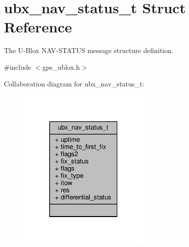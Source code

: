 \hypertarget{structubx__nav__status__t}{\section{ubx\+\_\+nav\+\_\+status\+\_\+t Struct Reference}
\label{structubx__nav__status__t}
}


The U-\/\+Blox N\+A\+V-\/\+S\+T\+A\+T\+U\+S message structure definition.  




{\ttfamily \#include $<$gps\+\_\+ublox.\+h$>$}



Collaboration diagram for ubx\+\_\+nav\+\_\+status\+\_\+t\+:
\nopagebreak
\begin{figure}[H]
\begin{center}
\leavevmode
\includegraphics[width=183pt]{structubx__nav__status__t__coll__graph}
\end{center}
\end{figure}
